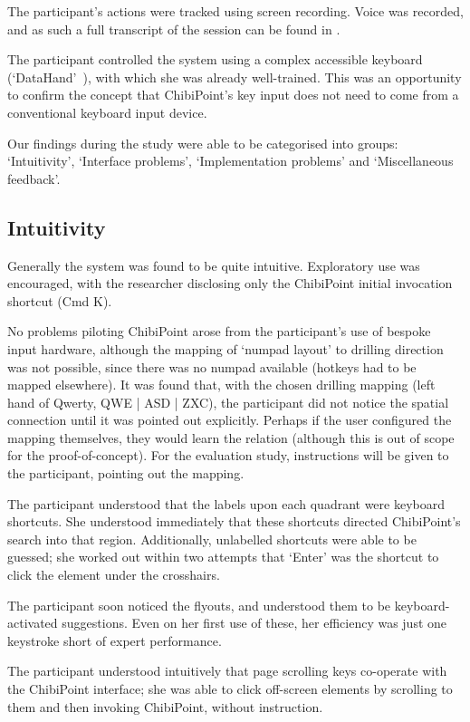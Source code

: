 \documentclass[11pt,openright,a4paper]{report}
\begin{document}
The participant's actions were tracked using screen recording. Voice was recorded, and as such a full transcript of the session can be found in .

The participant controlled the system using a complex accessible keyboard (`DataHand'~\cite{datahand}), with which she was already well-trained. This was an opportunity to confirm the concept that ChibiPoint's key input does not need to come from a conventional keyboard input device.

Our findings during the study were able to be categorised into groups: `Intuitivity', `Interface problems', `Implementation problems' and `Miscellaneous feedback'.

\subsection{Intuitivity}
Generally the system was found to be quite intuitive. Exploratory use was encouraged, with the researcher disclosing only the ChibiPoint initial invocation shortcut (Cmd K).

No problems piloting ChibiPoint arose from the participant's use of bespoke input hardware, although the mapping of `numpad layout' to drilling direction was not possible, since there was no numpad available (hotkeys had to be mapped elsewhere). It was found that, with the chosen drilling mapping (left hand of Qwerty, QWE | ASD | ZXC), the participant did not notice the spatial connection until it was pointed out explicitly. Perhaps if the user configured the mapping themselves, they would learn the relation (although this is out of scope for the proof-of-concept). For the evaluation study, instructions will be given to the participant, pointing out the mapping.

The participant understood that the labels upon each quadrant were keyboard shortcuts. She understood immediately that these shortcuts directed ChibiPoint's search into that region. Additionally, unlabelled shortcuts were able to be guessed; she worked out within two attempts that `Enter' was the shortcut to click the element under the crosshairs.

The participant soon noticed the flyouts, and understood them to be keyboard-activated suggestions. Even on her first use of these, her efficiency was just one keystroke short of expert performance.

The participant understood intuitively that page scrolling keys co-operate with the ChibiPoint interface; she was able to click off-screen elements by scrolling to them and then invoking ChibiPoint, without instruction.
\end{document}
